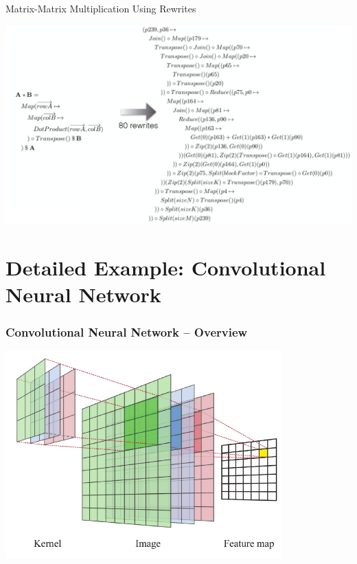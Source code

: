 \documentclass[10pt]{beamer}
\begin{document}
\begin{frame}{Matrix-Matrix Multiplication Using Rewrites}
        \begin{block}{}
        \begin{center}
            \includegraphics[width=\textwidth]{../images/matrixRewrites.pdf}
        \end{center}
        \end{block}
\end{frame}


\section{Detailed Example: Convolutional Neural Network }

\begin{frame}
\frametitle{Convolutional Neural Network -- Overview}
\vspace{-.5cm}
    \begin{block}{}
        \begin{center}
            \includegraphics[width=0.8\textwidth]{../images/conv.pdf}
        \end{center}
    \end{block}
\vspace{-1.2cm}
\end{frame}
\end{document}
